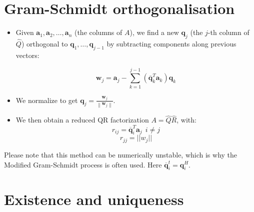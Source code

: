 \documentclass[11pt]{book}
\begin{document}
\section*{Gram-Schmidt orthogonalisation}
\begin{itemize}

\item Given $\mathbf{a}_{1}, \mathbf{a}_{2}, \ldots, \mathbf{a}_{n}$ (the columns of $A$), we find a new $\mathbf{q}_{j}$ (the $j$-th column of $\hat{Q}$) orthogonal to $\mathbf{q}_{1}, \ldots, \mathbf{q}_{j-1}$ by subtracting components along previous vectors:

$$
\mathbf{w}_{j}=\mathbf{a}_{j}-\sum_{k=1}^{j-1}\left(\overline{\mathbf{q}}_{k}^{T} \mathbf{a}_{k}\right) \mathbf{q}_{k}
$$
\item We normalize to get $\mathbf{q}_{j}=\frac{\mathbf{w}_{j}}{\left\|\mathbf{w}_{j}\right\|}$.
\item We then obtain a reduced QR factorization $A=\hat{Q}\hat{R}$, with:
$$
r_{i j}=\overline{\mathbf{q}}_{i}^{T} \mathbf{a}_{j} \ \ i \neq j
$$
$$
r_{j j}=|| w_j||
$$
\end{itemize}
Please note that this method can be numerically unstable, which is why the Modified Gram-Schmidt process is often used. Here $\overline{\textbf{q}}_i^{t} = \textbf{q}_i^{H}$.


\section*{Existence and uniqueness}
\end{document}
